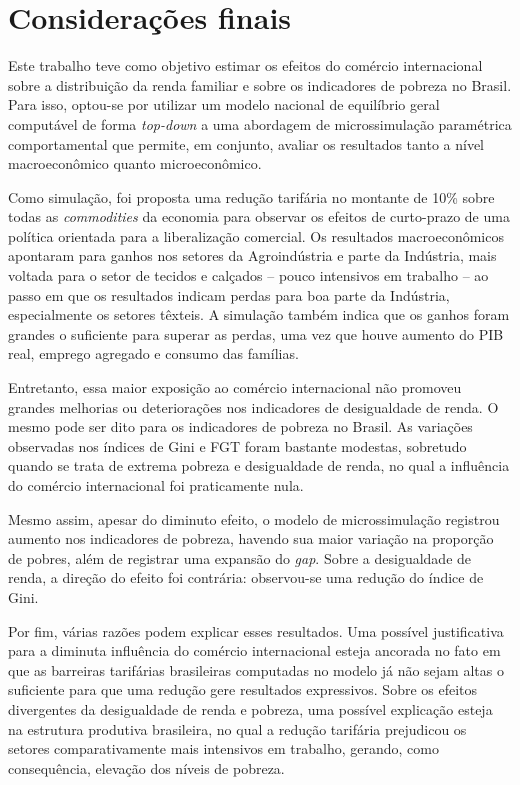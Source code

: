 

\chapter{Considerações finais}

Este trabalho teve como objetivo estimar os efeitos do comércio internacional sobre a distribuição da renda familiar e sobre os indicadores de pobreza no Brasil. Para isso, optou-se por utilizar um modelo nacional de equilíbrio geral computável de forma \textit{top-down} a uma abordagem de microssimulação paramétrica comportamental que permite, em conjunto, avaliar os resultados tanto a nível macroeconômico quanto microeconômico.

Como simulação, foi proposta uma redução tarifária no montante de 10\% sobre todas as \textit{commodities} da economia para observar os efeitos de curto-prazo de uma política orientada para a liberalização comercial. Os resultados macroeconômicos apontaram para ganhos nos setores da Agroindústria e parte da Indústria, mais voltada para o setor de tecidos e calçados -- pouco intensivos em trabalho -- ao passo em que os resultados indicam perdas para boa parte da Indústria, especialmente os setores têxteis. A simulação também indica que os ganhos foram grandes o suficiente para superar as perdas, uma vez que houve aumento do PIB real, emprego agregado e consumo das famílias.

Entretanto, essa maior exposição ao comércio internacional não promoveu grandes melhorias ou deteriorações nos indicadores de desigualdade de renda. O mesmo pode ser dito para os indicadores de pobreza no Brasil. As variações observadas nos índices de Gini e FGT foram bastante modestas, sobretudo quando se trata de extrema pobreza e desigualdade de renda, no qual a influência do comércio internacional foi praticamente nula.

Mesmo assim, apesar do diminuto efeito, o modelo de microssimulação registrou aumento nos indicadores de pobreza, havendo sua maior variação na proporção de pobres, além de registrar uma expansão do \textit{gap}. Sobre a desigualdade de renda, a direção do efeito foi contrária: observou-se uma redução do índice de Gini.

Por fim, várias razões podem explicar esses resultados. Uma possível justificativa para a diminuta influência do comércio internacional esteja ancorada no fato em que as barreiras tarifárias brasileiras computadas no modelo já não sejam altas o suficiente para que uma redução gere resultados expressivos. Sobre os efeitos divergentes da desigualdade de renda e pobreza, uma possível explicação esteja na estrutura produtiva brasileira, no qual a redução tarifária prejudicou os setores comparativamente mais intensivos em trabalho, gerando, como consequência, elevação dos níveis de pobreza.

